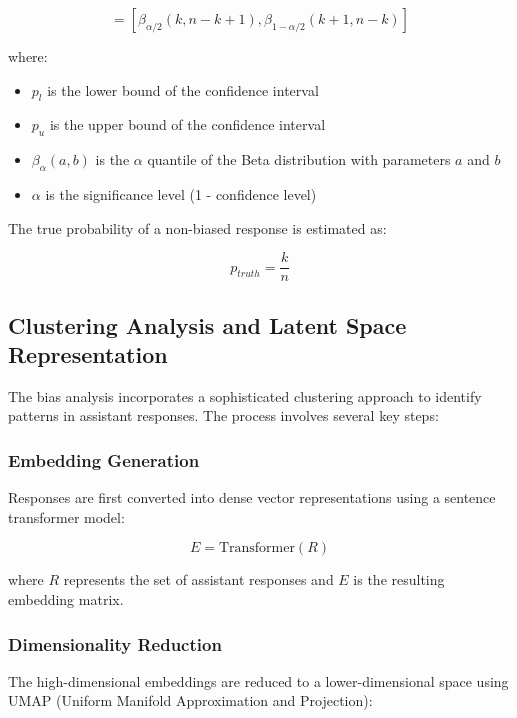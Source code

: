 \documentclass[12pt]{article}
\begin{document}
\begin{equation}
    [p_l, p_u] = [\beta_{\alpha/2}(k, n-k+1), \beta_{1-\alpha/2}(k+1, n-k)]
\end{equation}

where:
\begin{itemize}
    \item $p_l$ is the lower bound of the confidence interval
    \item $p_u$ is the upper bound of the confidence interval
    \item $\beta_{\alpha}(a,b)$ is the $\alpha$ quantile of the Beta distribution with parameters $a$ and $b$
    \item $\alpha$ is the significance level (1 - confidence level)
\end{itemize}

The true probability of a non-biased response is estimated as:

\begin{equation}
    p_{truth} = \frac{k}{n}
\end{equation}

\subsection{Clustering Analysis and Latent Space Representation}

The bias analysis incorporates a sophisticated clustering approach to identify patterns in assistant responses. The process involves several key steps:

\subsubsection{Embedding Generation}

Responses are first converted into dense vector representations using a sentence transformer model:

\begin{equation}
    E = \text{Transformer}(R)
\end{equation}

where $R$ represents the set of assistant responses and $E$ is the resulting embedding matrix.

\subsubsection{Dimensionality Reduction}

The high-dimensional embeddings are reduced to a lower-dimensional space using UMAP (Uniform Manifold Approximation and Projection):
\end{document}
